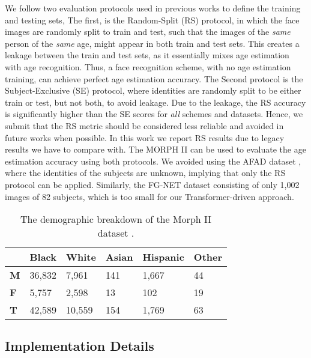 \documentclass[10pt,twocolumn,letterpaper]{article}
\begin{document}
We follow two evaluation protocols used in previous works to define the
training and testing sets, The first, is the Random-Split (RS) protocol, in
which the face images are randomly split to train and test, such that the
images of the \textit{same} person of the \textit{same} age, might appear in
both train and test sets. This creates a leakage between the train and test
sets, as it essentially mixes age estimation with age recognition. Thus, a
face recognition scheme, with no age estimation training, can achieve
perfect age estimation accuracy. The Second protocol is the
Subject-Exclusive (SE) protocol, where identities are randomly split to be
either train or test, but not both, to avoid leakage. Due to the leakage,
the RS accuracy is significantly higher than the SE scores for \textit{all}
schemes and datasets. Hence, we submit that the RS metric should be
considered less reliable and avoided in future works when possible. In this
work we report RS results due to legacy results we have to compare with. The
MORPH II can be used to evaluate the age estimation accuracy using both
protocols. We avoided using the AFAD dataset \cite{7780901}, where the identities of the
subjects are unknown, implying that only the RS protocol can be applied. Similarly, the FG-NET dataset \cite{cootes2008fg}
consisting of only 1,002 images of 82 subjects, which is too small for our Transformer-driven approach.
\begin{table}[tbh]
\begin{center}
\centering \begin{tabular}{l|l|l|l|l|l}
\hline
& \textbf{Black} & \textbf{White} & \textbf{Asian} & \textbf{Hispanic} &
\textbf{Other} \\ \hline\hline
\textbf{M} & 36,832 & 7,961 & 141 & 1,667 & 44 \\
\textbf{F} & 5,757 & 2,598 & 13 & 102 & 19 \\
\textbf{T} & 42,589 & 10,559 & 154 & 1,769 & 63 \\ \hline
\end{tabular}\end{center}
\caption{The demographic breakdown of the Morph II dataset \protect\cite {1613043}.}
\label{table:demographic_comparison}
\end{table}

\subsection{Implementation Details}

\label{subsec:Implementation Details}
\end{document}
